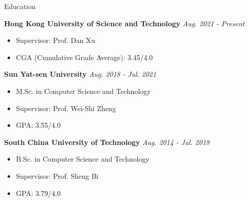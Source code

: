 \documentclass{resume} %
\begin{document}
\begin{rSection}{Education}

{\bf Hong Kong University of Science and Technology} \hfill {\em Aug. 2021 - Present}
\vspace{-3pt}
\begin{itemize}[leftmargin=18pt]
    \setlength{\itemsep}{-5pt}
    \item Supervisor: Prof. Dan Xu
    \item CGA (Cumulative Grade Average): 3.45/4.0
\end{itemize}

{\bf Sun Yat-sen University} \hfill {\em Aug. 2018 - Jul. 2021}
\vspace{-3pt}
\begin{itemize}[leftmargin=18pt]
    \setlength{\itemsep}{-5pt}
    \item M.Sc. in Computer Science and Technology
    \item Supervisor: Prof. Wei-Shi Zheng
    \item GPA: 3.55/4.0
\end{itemize}

{\bf South China University of Technology} \hfill {\em Aug. 2014 - Jul. 2018}
\vspace{-3pt}
\begin{itemize}[leftmargin=18pt]
    \setlength{\itemsep}{-5pt}
    \item B.Sc. in Computer Science and Technology
    \item Supervisor: Prof. Sheng Bi
    \item GPA: 3.79/4.0
\end{itemize}
\end{rSection}
\end{document}
